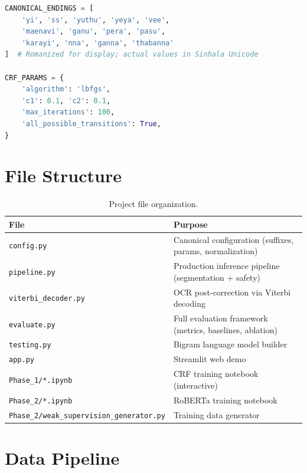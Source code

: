 \documentclass[12pt, a4paper, twoside]{report}
\begin{document}
\begin{lstlisting}[language=Python, caption={Excerpt from config.py — canonical configuration.}, label={lst:config}]
CANONICAL_ENDINGS = [
    'yi', 'ss', 'yuthu', 'yeya', 'vee',
    'maenavi', 'ganu', 'pera', 'pasu',
    'karayi', 'nna', 'ganna', 'thabanna'
]  # Romanized for display; actual values in Sinhala Unicode

CRF_PARAMS = {
    'algorithm': 'lbfgs',
    'c1': 0.1, 'c2': 0.1,
    'max_iterations': 100,
    'all_possible_transitions': True,
}
\end{lstlisting}

\section{File Structure}
\label{sec:files}

\begin{table}[htbp]
\centering
\caption{Project file organization.}
\label{tab:files}
\begin{tabular}{lp{8cm}}
\toprule
\textbf{File} & \textbf{Purpose} \\
\midrule
\texttt{config.py} & Canonical configuration (suffixes, params, normalization) \\
\texttt{pipeline.py} & Production inference pipeline (segmentation + safety) \\
\texttt{viterbi\_decoder.py} & OCR post-correction via Viterbi decoding \\
\texttt{evaluate.py} & Full evaluation framework (metrics, baselines, ablation) \\
\texttt{testing.py} & Bigram language model builder \\
\texttt{app.py} & Streamlit web demo \\
\texttt{Phase\_1/*.ipynb} & CRF training notebook (interactive) \\
\texttt{Phase\_2/*.ipynb} & RoBERTa training notebook \\
\texttt{Phase\_2/weak\_supervision\_generator.py} & Training data generator \\
\bottomrule
\end{tabular}
\end{table}

\section{Data Pipeline}
\label{sec:data-pipeline}
\end{document}

